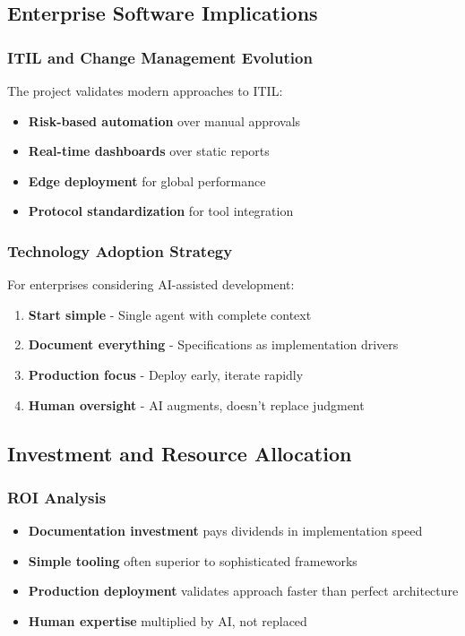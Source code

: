 \documentclass[11pt]{article}
\begin{document}
\subsection{Enterprise Software Implications}
\label{sec:orge927d80}
\subsubsection{ITIL and Change Management Evolution}
\label{sec:org0ed61b6}
The project validates modern approaches to ITIL:
\begin{itemize}
\item \textbf{\textbf{Risk-based automation}} over manual approvals
\item \textbf{\textbf{Real-time dashboards}} over static reports
\item \textbf{\textbf{Edge deployment}} for global performance
\item \textbf{\textbf{Protocol standardization}} for tool integration
\end{itemize}
\subsubsection{Technology Adoption Strategy}
\label{sec:org5629ae5}
For enterprises considering AI-assisted development:
\begin{enumerate}
\item \textbf{\textbf{Start simple}} - Single agent with complete context
\item \textbf{\textbf{Document everything}} - Specifications as implementation drivers
\item \textbf{\textbf{Production focus}} - Deploy early, iterate rapidly
\item \textbf{\textbf{Human oversight}} - AI augments, doesn't replace judgment
\end{enumerate}
\subsection{Investment and Resource Allocation}
\label{sec:orgb794b0b}
\subsubsection{ROI Analysis}
\label{sec:org03b9be6}
\begin{itemize}
\item \textbf{\textbf{Documentation investment}} pays dividends in implementation speed
\item \textbf{\textbf{Simple tooling}} often superior to sophisticated frameworks
\item \textbf{\textbf{Production deployment}} validates approach faster than perfect architecture
\item \textbf{\textbf{Human expertise}} multiplied by AI, not replaced
\end{itemize}
\end{document}

